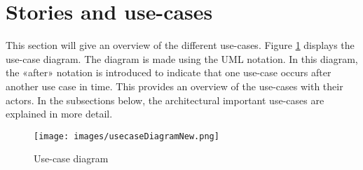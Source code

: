 

\clearpage


\section{Stories and use-cases}
This section will give an overview of the different use-cases. Figure \ref{fig:usecase-diagram} displays the use-case diagram. The diagram is made using the UML notation. In this diagram, the «after» notation is introduced to indicate that one use-case occurs after another use case in time. This provides an overview of the use-cases with their actors. In the subsections below, the architectural important use-cases are explained in more detail.

\begin{figure}[H]
	\centering
	\texttt{[image: images/usecaseDiagramNew.png]}
	\caption{Use-case diagram}
	\label{fig:usecase-diagram}
\end{figure}





\clearpage
